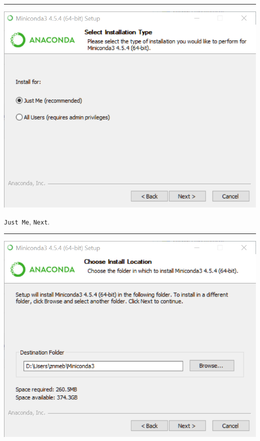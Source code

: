 \documentclass[]{book}
\theoremstyle{definition}
\theoremstyle{definition}
\theoremstyle{definition}
\theoremstyle{remark}
\begin{document}
\begin{center}\rule{0.5\linewidth}{\linethickness}\end{center}

\begin{center}\includegraphics[width=0.9\linewidth]{screenshots/2018-08-31_16_14_23-Miniconda3_4.5.4_(64-bit)_Setup} \end{center}

\texttt{Just\ Me}, \texttt{Next}.

\begin{center}\rule{0.5\linewidth}{\linethickness}\end{center}

\begin{center}\includegraphics[width=0.9\linewidth]{screenshots/2018-08-31_16_16_11-Miniconda3_4.5.4_(64-bit)_Setup} \end{center}
\end{document}
